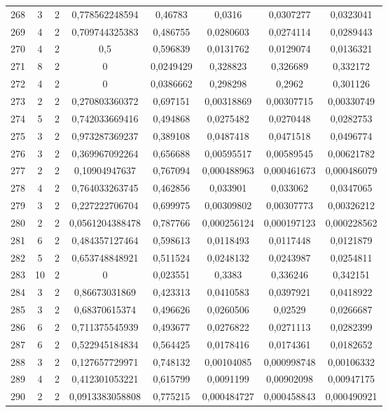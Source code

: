\begin{longtable}{|c|c|c|c|c|c|c|c|}
268 & 3 & 2 & 0,778562248594 & 0,46783 & 0,0316 & 0,0307277 & 0,0323041  \\
269 & 4 & 2 & 0,709744325383 & 0,486755 & 0,0280603 & 0,0274114 & 0,0289443  \\
270 & 4 & 2 & 0,5 & 0,596839 & 0,0131762 & 0,0129074 & 0,0136321  \\
271 & 8 & 2 & 0 & 0,0249429 & 0,328823 & 0,326689 & 0,332172  \\
272 & 4 & 2 & 0 & 0,0386662 & 0,298298 & 0,2962 & 0,301126  \\
273 & 2 & 2 & 0,270803360372 & 0,697151 & 0,00318869 & 0,00307715 & 0,00330749  \\
274 & 5 & 2 & 0,742033669416 & 0,494868 & 0,0275482 & 0,0270448 & 0,0282753  \\
275 & 3 & 2 & 0,973287369237 & 0,389108 & 0,0487418 & 0,0471518 & 0,0496774  \\
276 & 3 & 2 & 0,369967092264 & 0,656688 & 0,00595517 & 0,00589545 & 0,00621782  \\
277 & 2 & 2 & 0,10904947637 & 0,767094 & 0,000488963 & 0,000461673 & 0,000486079  \\
278 & 4 & 2 & 0,764033263745 & 0,462856 & 0,033901 & 0,033062 & 0,0347065  \\
279 & 3 & 2 & 0,227222706704 & 0,699975 & 0,00309802 & 0,00307773 & 0,00326212  \\
280 & 2 & 2 & 0,0561204388478 & 0,787766 & 0,000256124 & 0,000197123 & 0,000228562  \\
281 & 6 & 2 & 0,484357127464 & 0,598613 & 0,0118493 & 0,0117448 & 0,0121879  \\
282 & 5 & 2 & 0,653748848921 & 0,511524 & 0,0248132 & 0,0243987 & 0,0254811  \\
283 & 10 & 2 & 0 & 0,023551 & 0,3383 & 0,336246 & 0,342151  \\
284 & 3 & 2 & 0,86673031869 & 0,423313 & 0,0410583 & 0,0397921 & 0,0418922  \\
285 & 3 & 2 & 0,68370615374 & 0,496626 & 0,0260506 & 0,02529 & 0,0266687  \\
286 & 6 & 2 & 0,711375545939 & 0,493677 & 0,0276822 & 0,0271113 & 0,0282399  \\
287 & 6 & 2 & 0,522945184834 & 0,564425 & 0,0178416 & 0,0174361 & 0,0182652  \\
288 & 3 & 2 & 0,127657729971 & 0,748132 & 0,00104085 & 0,000998748 & 0,00106332  \\
289 & 4 & 2 & 0,412301053221 & 0,615799 & 0,0091199 & 0,00902098 & 0,00947175  \\
290 & 2 & 2 & 0,0913383058808 & 0,775215 & 0,000484727 & 0,000458843 & 0,000490921  \\

\end{longtable}
